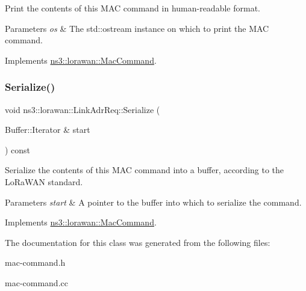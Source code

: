 Print the contents of this M\+AC command in human-\/readable format.


\begin{DoxyParams}{Parameters}
{\em os} & The std\+::ostream instance on which to print the M\+AC command. \\
\hline
\end{DoxyParams}


Implements \hyperlink{classns3_1_1lorawan_1_1MacCommand_a6bf88db38dab7dcd817811a9fb59f920}{ns3\+::lorawan\+::\+Mac\+Command}.

\mbox{\label{classns3_1_1lorawan_1_1LinkAdrReq_a92d99d7a9893de77be8bd14ef0109c53}} 
\subsubsection{\texorpdfstring{Serialize()}{Serialize()}}
{\footnotesize\ttfamily void ns3\+::lorawan\+::\+Link\+Adr\+Req\+::\+Serialize (\begin{DoxyParamCaption}\item[{Buffer\+::\+Iterator \&}]{start }\end{DoxyParamCaption}) const\hspace{0.3cm}{\ttfamily [virtual]}}

Serialize the contents of this M\+AC command into a buffer, according to the Lo\+Ra\+W\+AN standard.


\begin{DoxyParams}{Parameters}
{\em start} & A pointer to the buffer into which to serialize the command. \\
\hline
\end{DoxyParams}


Implements \hyperlink{classns3_1_1lorawan_1_1MacCommand_a0ed44b33942ddc3dc9694dc06ab0b87f}{ns3\+::lorawan\+::\+Mac\+Command}.



The documentation for this class was generated from the following files\+:\begin{DoxyCompactItemize}
\item 
mac-\/command.\+h\item 
mac-\/command.\+cc\end{DoxyCompactItemize}
